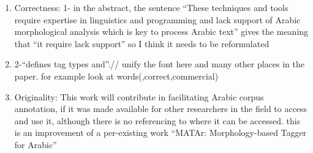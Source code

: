 \begin{enumerate}[leftmargin=0mm,label=\bfseries CommentR3.\arabic*]


\item \label{Review.3.32}
Correctness: 
1- in the abstract, the sentence ``These techniques and 
tools require expertise in linguistics and programming and 
lack support of Arabic morphological analysis which is key to 
process Arabic text''
gives the meaning that ``it require lack support'' so I think it 
needs to be reformulated 



\item \label{Review.3.33}
2-``defines tag types and''.// unify the font here and 
many other places in the paper. 
for example look at words(,correct,commercial)


\item \label{Review.3.34}
Originality:  
This work will contribute in facilitating Arabic corpus 
annotation, if it was made available for other researchers in 
the field to access and use it, although there is no 
referencing to where it can be accessed. 
this is an improvement of a per-existing work ``MATAr: Morphology-based Tagger for Arabic''



\end{enumerate}
